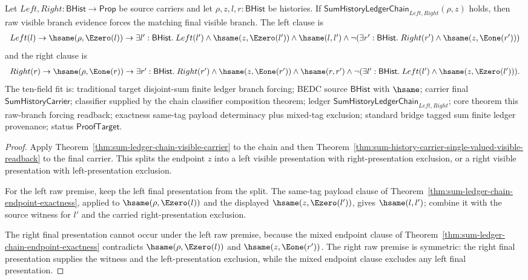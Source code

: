 \begin{theorem}
\label{thm:sum-ledger-chain-raw-branch-forces-final-readback}
Let $Left,Right:\mathsf{BHist}\to\mathsf{Prop}$ be source carriers and let
$\rho,z,l,r:\mathsf{BHist}$ be histories. If
$\mathsf{SumHistoryLedgerChain}_{Left,Right}(\rho,z)$ holds, then raw visible
branch evidence forces the matching final visible branch. The left clause is
$$
\begin{array}{l}
Left(l)\to \hsame(\rho,\Ezero(l))\to
\exists l':\mathsf{BHist}.\; Left(l')\land\hsame(z,\Ezero(l'))\land
\hsame(l,l')\land
\neg(\exists r':\mathsf{BHist}.\; Right(r')\land\hsame(z,\Eone(r')))
\end{array}
$$
and the right clause is
$$
\begin{array}{l}
Right(r)\to \hsame(\rho,\Eone(r))\to
\exists r':\mathsf{BHist}.\; Right(r')\land\hsame(z,\Eone(r'))\land
\hsame(r,r')\land
\neg(\exists l':\mathsf{BHist}.\; Left(l')\land\hsame(z,\Ezero(l'))).
\end{array}
$$
The ten-field fit is: traditional target disjoint-sum finite ledger branch
forcing; BEDC source $\mathsf{BHist}$ with $\hsame$; carrier final
$\mathsf{SumHistoryCarrier}$; classifier supplied by the chain classifier
composition theorem; ledger $\mathsf{SumHistoryLedgerChain}_{Left,Right}$; core
theorem this raw-branch forcing readback; exactness same-tag payload determinacy
plus mixed-tag exclusion; standard bridge tagged sum finite ledger provenance;
status $\mathsf{ProofTarget}$.
\end{theorem}
\begin{proof}
Apply Theorem~\ref{thm:sum-ledger-chain-visible-carrier} to the chain and then
Theorem~\ref{thm:sum-history-carrier-single-valued-visible-readback} to the
final carrier. This splits the endpoint $z$ into a left visible presentation
with right-presentation exclusion, or a right visible presentation with
left-presentation exclusion.

For the left raw premise, keep the left final presentation from the split. The
same-tag payload clause of
Theorem~\ref{thm:sum-ledger-chain-endpoint-exactness}, applied to
$\hsame(\rho,\Ezero(l))$ and the displayed $\hsame(z,\Ezero(l'))$, gives
$\hsame(l,l')$; combine it with the source witness for $l'$ and the carried
right-presentation exclusion.

The right final presentation cannot occur under the left raw premise, because
the mixed endpoint clause of
Theorem~\ref{thm:sum-ledger-chain-endpoint-exactness} contradicts
$\hsame(\rho,\Ezero(l))$ and $\hsame(z,\Eone(r'))$. The right raw premise is
symmetric: the right final presentation supplies the witness and the
left-presentation exclusion, while the mixed endpoint clause excludes any left
final presentation.
\end{proof}

